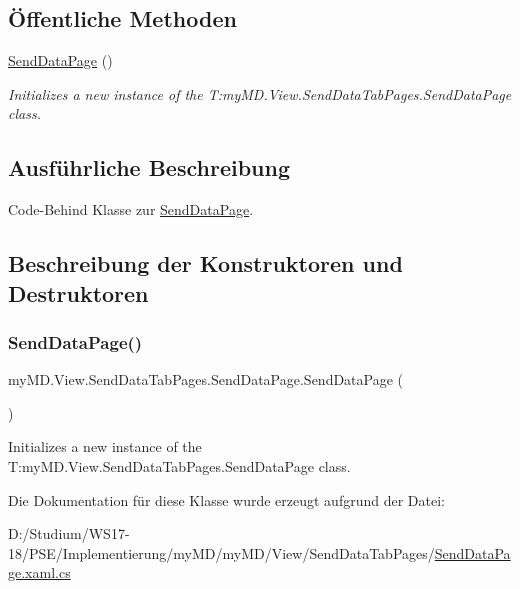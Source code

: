 \subsection*{Öffentliche Methoden}
\begin{DoxyCompactItemize}
\item 
\mbox{\hyperlink{classmy_m_d_1_1_view_1_1_send_data_tab_pages_1_1_send_data_page_a7fbb8405720e4cc1c28ed4315fccde8e}{Send\+Data\+Page}} ()
\begin{DoxyCompactList}\small\item\em Initializes a new instance of the T\+:my\+M\+D.\+View.\+Send\+Data\+Tab\+Pages.\+Send\+Data\+Page class. \end{DoxyCompactList}\end{DoxyCompactItemize}


\subsection{Ausführliche Beschreibung}
Code-\/\+Behind Klasse zur \mbox{\hyperlink{classmy_m_d_1_1_view_1_1_send_data_tab_pages_1_1_send_data_page}{Send\+Data\+Page}}. 



\subsection{Beschreibung der Konstruktoren und Destruktoren}
\mbox{\label{classmy_m_d_1_1_view_1_1_send_data_tab_pages_1_1_send_data_page_a7fbb8405720e4cc1c28ed4315fccde8e}} 
\subsubsection{\texorpdfstring{Send\+Data\+Page()}{SendDataPage()}}
{\footnotesize\ttfamily my\+M\+D.\+View.\+Send\+Data\+Tab\+Pages.\+Send\+Data\+Page.\+Send\+Data\+Page (\begin{DoxyParamCaption}{ }\end{DoxyParamCaption})}



Initializes a new instance of the T\+:my\+M\+D.\+View.\+Send\+Data\+Tab\+Pages.\+Send\+Data\+Page class. 



Die Dokumentation für diese Klasse wurde erzeugt aufgrund der Datei\+:\begin{DoxyCompactItemize}
\item 
D\+:/\+Studium/\+W\+S17-\/18/\+P\+S\+E/\+Implementierung/my\+M\+D/my\+M\+D/\+View/\+Send\+Data\+Tab\+Pages/\mbox{\hyperlink{_send_data_page_8xaml_8cs}{Send\+Data\+Page.\+xaml.\+cs}}\end{DoxyCompactItemize}
